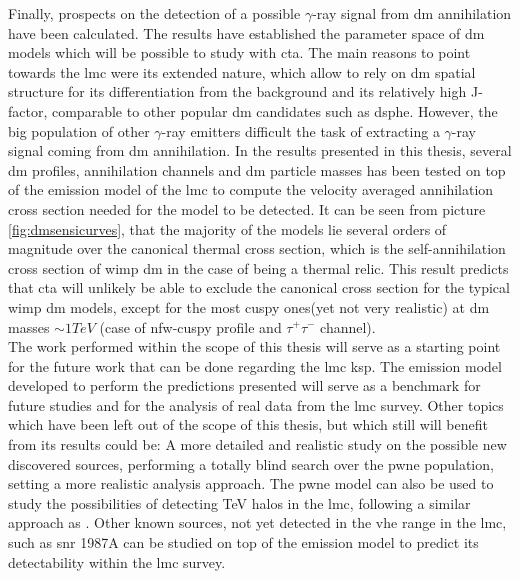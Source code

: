 \documentclass[main.tex]{subfiles}
\begin{document}
Finally, prospects on the detection of a possible $\gamma$-ray signal from \gls{dm} annihilation have been calculated. The results have established the parameter space of \gls{dm} models which will be possible to study with \gls{cta}. The main reasons to point towards the \gls{lmc} were its extended nature, which allow to rely on \gls{dm} spatial structure for its differentiation from the background and its relatively high J-factor, comparable to other popular \gls{dm} candidates such as \gls{dsphe}. However, the big population of other $\gamma$-ray emitters difficult the task of extracting a $\gamma$-ray signal coming from \gls{dm} annihilation. In the results presented in this thesis, several \gls{dm} profiles, annihilation channels and \gls{dm} particle masses has been tested on top of the emission model of the \gls{lmc} to compute the velocity averaged annihilation cross section needed for the model to be detected. It can be seen from picture \ref{fig:dmsensicurves}, that the majority of the models lie several orders of magnitude over the canonical thermal cross section, which is the self-annihilation cross section of \gls{wimp} \gls{dm} in the case of being a thermal relic. This result predicts that \gls{cta} will unlikely be able to exclude the canonical cross section for the typical \gls{wimp} \gls{dm} models, except for the most cuspy ones(yet not very realistic) at \gls{dm} masses $\sim 1 TeV$ (case of nfw-cuspy profile and $\tau^+ \tau^-$ channel).\\

The work performed within the scope of this thesis will serve as a starting point for the future work that can be done regarding the \gls{lmc} \gls{ksp}. The emission model developed to perform the predictions presented will serve as a benchmark for future studies and for the analysis of real data from the \gls{lmc} survey.
Other topics which have been left out of the scope of this thesis, but which still will benefit from its results could be: A more detailed and realistic study on the possible new discovered sources, performing a totally blind search over the \gls{pwne} population, setting a more realistic analysis approach. The \gls{pwne} model can also be used to study the possibilities of detecting TeV halos in the \gls{lmc}, following a similar approach as \cite{2019tevhalos}. 
Other known sources, not yet detected in the \gls{vhe} range in the \gls{lmc}, such as \gls{snr} 1987A can be studied on top of the emission model to predict its detectability within the \gls{lmc} survey.
\end{document}
